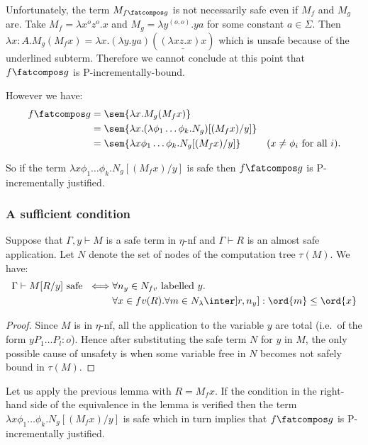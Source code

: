  

Unfortunately, the term $M_{f\fatcompos g}$ is not necessarily safe even if $M_f$ and $M_g$ are. Take $M_f = \lambda x^o z^o.x$ and
$M_g = \lambda y^{(o,o)} . y a$ for some constant $a\in \Sigma$.
Then $\lambda x:A . M_g (M_f x) = \lambda x . (\lambda y . y a) ( \underline{(\lambda x z.x) x} )$ which is unsafe because of the underlined subterm. Therefore we cannot conclude at this point that $f\fatcompos g$ is P-incrementally-bound.

However we have:
\begin{align*}
f\fatcompos g &= \sem{\lambda x . M_g (M_f x)} \\
 &= \sem{\lambda x . (\lambda \phi_1\ldots \phi_k . N_g) [(M_f x) / y]} \\
&= \sem{\lambda x \phi_1 \dots \phi_k. N_g [(M_f x) / y]}
& \mbox{($x\neq\phi_i$ for all $i$)}.
\end{align*}

So if the term  $\lambda x \phi_1 \dots \phi_k. N_g [(M_f x) / y]$ is safe then $f\fatcompos g$ is P-incrementally justified.

\subsubsection{A sufficient condition}
\begin{lemma}
Suppose that $\Gamma,y \vdash M$ is a safe term in $\eta$-nf and $\Gamma \vdash R$ is an almost safe application. Let $N$ denote the set of nodes of the computation tree $\tau(M)$. We have:
\begin{align*}
\Gamma \vdash M[R/y] \mbox{ safe } 
\iff& \forall n_y \in N_{fv} \mbox{ labelled $y$}. \\
  &\forall x \in fv(R) . \forall m \in N_{\lambda} \inter ]r,n_y] : \ord{m} \leq \ord{x}
\end{align*}
\end{lemma}
\begin{proof}
Since $M$ is in $\eta$-nf, all the application to the variable $y$ are total (i.e.~of the form $y P_1 \ldots P_l :o$). Hence after substituting the safe term $N$ for $y$ in $M$, the only possible cause of unsafety is when
some variable free in $N$ becomes not safely bound in $\tau(M)$.
\end{proof}

Let us apply the previous lemma with $R= M_f x$. If the condition in the right-hand side of the equivalence in the lemma is verified then the term  $\lambda x \phi_1 \dots \phi_k. N_g [(M_f x) / y]$ is safe which in turn implies that $f\fatcompos g$ is P-incrementally justified.

